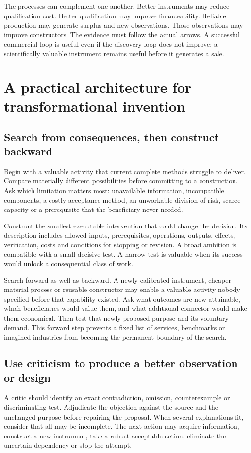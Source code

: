 \documentclass[11pt,letterpaper]{article}
\begin{document}
The processes can complement one another. Better instruments may reduce qualification cost. Better qualification may improve financeability. Reliable production may generate surplus and new observations. Those observations may improve constructors. The evidence must follow the actual arrows. A successful commercial loop is useful even if the discovery loop does not improve; a scientifically valuable instrument remains useful before it generates a sale.

\section{A practical architecture for transformational invention}
\subsection{Search from consequences, then construct backward}
Begin with a valuable activity that current complete methods struggle to deliver. Compare materially different possibilities before committing to a construction. Ask which limitation matters most: unavailable information, incompatible components, a costly acceptance method, an unworkable division of risk, scarce capacity or a prerequisite that the beneficiary never needed.

Construct the smallest executable intervention that could change the decision. Its description includes allowed inputs, prerequisites, operations, outputs, effects, verification, costs and conditions for stopping or revision. A broad ambition is compatible with a small decisive test. A narrow test is valuable when its success would unlock a consequential class of work.

Search forward as well as backward. A newly calibrated instrument, cheaper material process or reusable constructor may enable a valuable activity nobody specified before that capability existed. Ask what outcomes are now attainable, which beneficiaries would value them, and what additional connector would make them economical. Then test that newly proposed purpose and its voluntary demand. This forward step prevents a fixed list of services, benchmarks or imagined industries from becoming the permanent boundary of the search.

\subsection{Use criticism to produce a better observation or design}
A critic should identify an exact contradiction, omission, counterexample or discriminating test. Adjudicate the objection against the source and the unchanged purpose before repairing the proposal. When several explanations fit, consider that all may be incomplete. The next action may acquire information, construct a new instrument, take a robust acceptable action, eliminate the uncertain dependency or stop the attempt.
\end{document}
